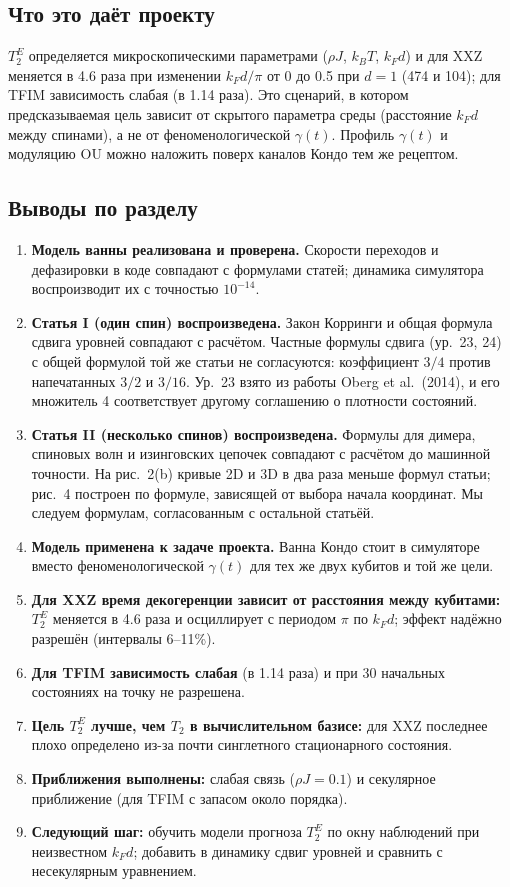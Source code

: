 \documentclass[12pt,a4paper]{article}
\newcommand{\rhoJ}{\rho J}
\newcommand{\kT}{k_BT}
\begin{document}
\subsection{Что это даёт проекту}

$T_2^E$ определяется микроскопическими параметрами ($\rhoJ$, $\kT$, $k_Fd$) и для XXZ меняется в 4.6 раза
при изменении $k_Fd/\pi$ от 0 до 0.5 при $d=1$ (474 и 104); для TFIM зависимость слабая (в 1.14 раза). Это
сценарий, в котором предсказываемая цель зависит от скрытого параметра среды (расстояние
$k_Fd$ между спинами), а не от феноменологической $\gamma(t)$. Профиль $\gamma(t)$ и модуляцию OU можно
наложить поверх каналов Кондо тем же рецептом.

\subsection{Выводы по разделу}
\begin{enumerate}
\item \textbf{Модель ванны реализована и проверена.} Скорости переходов и дефазировки в коде совпадают с
  формулами статей; динамика симулятора воспроизводит их с точностью $10^{-14}$.
\item \textbf{Статья I (один спин) воспроизведена.} Закон Корринги и общая формула сдвига уровней совпадают с
  расчётом. Частные формулы сдвига (ур.~23, 24) с общей формулой той же статьи не согласуются: коэффициент
  $3/4$ против напечатанных $3/2$ и $3/16$. Ур.~23 взято из работы Oberg et al.\ (2014), и его
  множитель 4 соответствует другому соглашению о плотности состояний.
\item \textbf{Статья II (несколько спинов) воспроизведена.} Формулы для димера, спиновых волн и изинговских
  цепочек совпадают с расчётом до машинной точности. На рис.~2(b) кривые 2D и 3D в два раза меньше формул
  статьи; рис.~4 построен по формуле, зависящей от выбора начала координат. Мы следуем формулам,
  согласованным с остальной статьёй.
\item \textbf{Модель применена к задаче проекта.} Ванна Кондо стоит в симуляторе вместо феноменологической
  $\gamma(t)$ для тех же двух кубитов и той же цели.
\item \textbf{Для XXZ время декогеренции зависит от расстояния между кубитами:} $T_2^E$ меняется в 4.6 раза и
  осциллирует с периодом $\pi$ по $k_Fd$; эффект надёжно разрешён (интервалы 6--11\%).
\item \textbf{Для TFIM зависимость слабая} (в 1.14 раза) и при 30 начальных состояниях на точку не разрешена.
\item \textbf{Цель $T_2^E$ лучше, чем $T_2$ в вычислительном базисе:} для XXZ последнее плохо определено из-за
  почти синглетного стационарного состояния.
\item \textbf{Приближения выполнены:} слабая связь ($\rhoJ=0.1$) и секулярное приближение (для TFIM с запасом
  около порядка).
\item \textbf{Следующий шаг:} обучить модели прогноза $T_2^E$ по окну наблюдений при неизвестном $k_Fd$;
  добавить в динамику сдвиг уровней и сравнить с несекулярным уравнением.
\end{enumerate}
\end{document}
